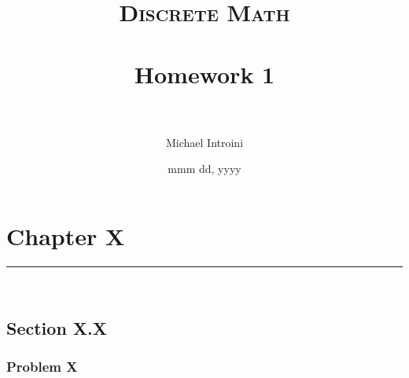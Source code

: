 \documentclass[paper=a4, fontsize=11pt]{scrartcl} %
\title{	
\normalfont \normalsize 
\textsc{Discrete Math} \\ [25pt] %
\horrule{0.5pt} \\[0.2cm] %
\large Homework 1 \\ %
\horrule{2pt} \\[0.2cm] %
}
\author{Michael Introini} %
\date{\normalsize{mmm dd, yyyy}} %
\newcommand{\horrule}[1]{\rule{\linewidth}{#1}} %
\begin{document}
\maketitle %


\section*{Chapter X}

\horrule{0.5pt} \\ %
\subsection*{Section X.X}
\subsubsection*{Problem X}
\end{document}
